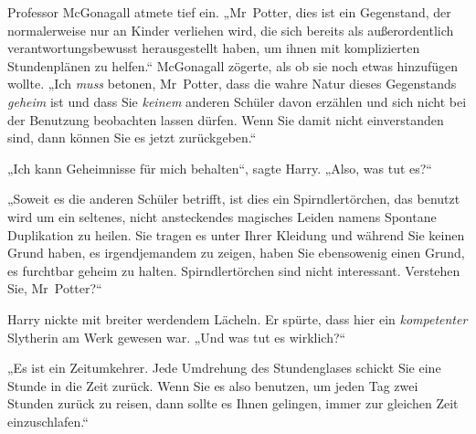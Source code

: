 Professor McGonagall atmete tief ein. „Mr~Potter, dies ist ein Gegenstand, der normalerweise nur an Kinder verliehen wird, die sich bereits als außerordentlich verantwortungsbewusst herausgestellt haben, um ihnen mit komplizierten Stundenplänen zu helfen.“ McGonagall zögerte, als ob sie noch etwas hinzufügen wollte. „Ich \emph{muss} betonen, Mr~Potter, dass die wahre Natur dieses Gegenstands \emph{geheim} ist und dass Sie \emph{keinem} anderen Schüler davon erzählen und sich nicht bei der Benutzung beobachten lassen dürfen. Wenn Sie damit nicht einverstanden sind, dann können Sie es jetzt zurückgeben.“

„Ich kann Geheimnisse für mich behalten“, sagte Harry. „Also, was tut es?“

„Soweit es die anderen Schüler betrifft, ist dies ein Spirndlertörchen, das benutzt wird um ein seltenes, nicht ansteckendes magisches Leiden namens Spontane Duplikation zu heilen. Sie tragen es unter Ihrer Kleidung und während Sie keinen Grund haben, es irgendjemandem zu zeigen, haben Sie ebensowenig einen Grund, es furchtbar geheim zu halten. Spirndlertörchen sind nicht interessant. Verstehen Sie, Mr~Potter?“

Harry nickte mit breiter werdendem Lächeln. Er spürte, dass hier ein \emph{kompetenter} Slytherin am Werk gewesen war. „Und was tut es wirklich?“

„Es ist ein Zeitumkehrer. Jede Umdrehung des Stundenglases schickt Sie eine Stunde in die Zeit zurück. Wenn Sie es also benutzen, um jeden Tag zwei Stunden zurück zu reisen, dann sollte es Ihnen gelingen, immer zur gleichen Zeit einzuschlafen.“

